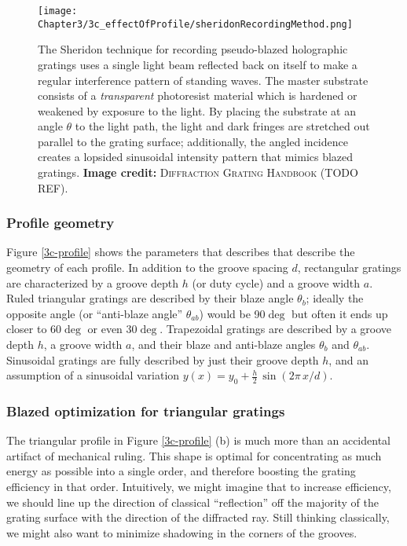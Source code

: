 \begin{figure}[htbp] %
   \centering
   \texttt{[image: Chapter3/3c\_effectOfProfile/sheridonRecordingMethod.png]}
   \caption{The Sheridon technique for recording pseudo-blazed holographic gratings uses a single light beam reflected back on itself to make a regular interference pattern of standing waves.  The master substrate consists of a \emph{transparent} photoresist material which is hardened or weakened by exposure to the light.  By placing the substrate at an angle $\theta$ to the light path, the light and dark fringes are stretched out parallel to the grating surface; additionally, the angled incidence creates a lopsided sinusoidal intensity pattern that mimics blazed gratings. \textbf{Image credit: }\textsc{Diffraction Grating Handbook} (TODO REF).}
   \label{3c-sheridon}
\end{figure}


\subsubsection{Profile geometry}
Figure \ref{3c-profile} shows the parameters that describes that describe the geometry of each profile.  In addition to the groove spacing $d$, rectangular gratings are characterized by a groove depth $h$ (or duty cycle) and a groove width $a$.  Ruled triangular gratings are described by their blaze angle $\theta_b$; ideally the opposite angle (or ``anti-blaze angle'' $\theta_{ab}$) would be 90$\deg$ but often it ends up closer to 60$\deg$ or even 30$\deg$.  Trapezoidal gratings are described by a groove depth $h$, a groove width $a$, and their blaze and anti-blaze angles $\theta_b$ and $\theta_{ab}$.  Sinusoidal gratings are fully described by just their groove depth $h$, and an assumption of a sinusoidal variation $y(x) = y_0 + \frac{h}{2}\, \sin(2\pi \,x / d)$.

\subsubsection{Blazed optimization for triangular gratings}
\label{blazeAngle}
The triangular profile in Figure \ref{3c-profile} (b) is much more than an accidental artifact of mechanical ruling.  This shape is optimal for concentrating as much energy as possible into a single order, and therefore boosting the grating efficiency in that order.  Intuitively, we might imagine that to increase efficiency, we should line up the direction of classical ``reflection'' off the majority of the grating surface with the direction of the diffracted ray.  Still thinking classically, we might also want to minimize shadowing in the corners of the grooves. 


